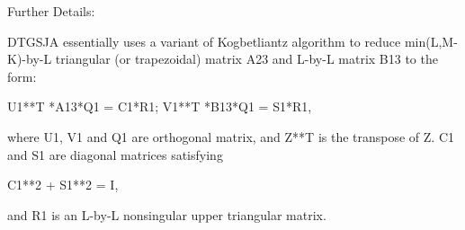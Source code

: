 \begin{DoxyParagraph}{Further Details\+: }
\begin{DoxyVerb}  DTGSJA essentially uses a variant of Kogbetliantz algorithm to reduce
  min(L,M-K)-by-L triangular (or trapezoidal) matrix A23 and L-by-L
  matrix B13 to the form:

           U1**T *A13*Q1 = C1*R1; V1**T *B13*Q1 = S1*R1,

  where U1, V1 and Q1 are orthogonal matrix, and Z**T is the transpose
  of Z.  C1 and S1 are diagonal matrices satisfying

                C1**2 + S1**2 = I,

  and R1 is an L-by-L nonsingular upper triangular matrix.\end{DoxyVerb}
 
\end{DoxyParagraph}
